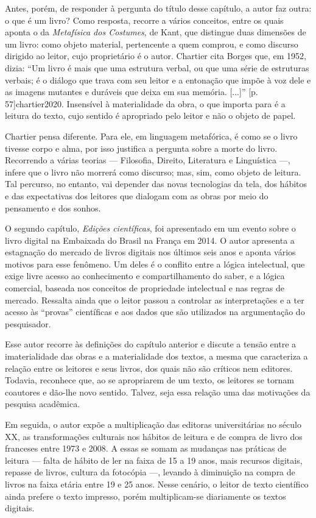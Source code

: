 \documentclass[portuguese]{textolivre}
\begin{document}
Antes, porém, de responder à pergunta do título desse capítulo, a autor faz outra: o que é um livro? Como resposta, recorre a vários conceitos, entre os quais aponta o da \emph{Metafísica dos Costumes}, de Kant, que distingue duas dimensões de um livro: como objeto material, pertencente a quem comprou, e como discurso dirigido ao leitor, cujo proprietário é o autor. Chartier cita Borges que, em 1952, dizia: “Um livro é mais que uma estrutura verbal, ou que uma série de estruturas verbais; é o diálogo que trava com seu leitor e a entonação que impõe à voz dele e as imagens mutantes e duráveis que deixa em sua memória. [...]” [p. 57]{chartier2020}. Insensível à materialidade da obra, o que importa para \textcite{borges2012} é a leitura do texto, cujo sentido é apropriado pelo leitor e não o objeto de papel.

Chartier pensa diferente. Para ele, em linguagem metafórica, é como se o livro tivesse corpo e alma, por isso justifica a pergunta sobre a morte do livro. Recorrendo a várias teorias — Filosofia, Direito, Literatura e Linguística —, infere que o livro não morrerá como discurso; mas, sim, como objeto de leitura. Tal percurso, no entanto, vai depender das novas tecnologias da tela, dos hábitos e das expectativas dos leitores que dialogam com as obras por meio do pensamento e dos sonhos.

O segundo capítulo, \emph{Edições científicas}, foi apresentado em um evento sobre o livro digital na Embaixada do Brasil na França em 2014. O autor apresenta a estagnação do mercado de livros digitais nos últimos seis anos e aponta vários motivos para esse fenômeno. Um deles é o conflito entre a lógica intelectual, que exige livre acesso ao conhecimento e compartilhamento do saber, e a lógica comercial, baseada nos conceitos de propriedade intelectual e nas regras de mercado. Ressalta ainda que o leitor passou a controlar as interpretações e a ter acesso às “provas” científicas e aos dados que são utilizados na argumentação do pesquisador.

Esse autor recorre às definições do capítulo anterior e discute a tensão entre a imaterialidade das obras e a materialidade dos textos, a mesma que caracteriza a relação entre os leitores e seus livros, dos quais não são críticos nem editores. Todavia,  reconhece que, ao se apropriarem de um texto, os leitores se tornam coautores e dão-lhe novo sentido. Talvez, seja essa relação uma das motivações da pesquisa acadêmica.

Em seguida, o autor expõe a multiplicação das editoras universitárias no século XX, as transformações culturais nos hábitos de leitura e de compra de livro dos franceses entre 1973 e 2008. A essas se somam as mudanças nas práticas de leitura — falta de hábito de ler na faixa de 15 a 19 anos, mais recursos digitais, repasse de livros, cultura da fotocópia —, levando à diminuição na compra de livros na faixa etária entre 19 e 25 anos. Nesse cenário, o leitor de texto científico ainda prefere o texto impresso, porém multiplicam-se diariamente os textos digitais.
\end{document}
